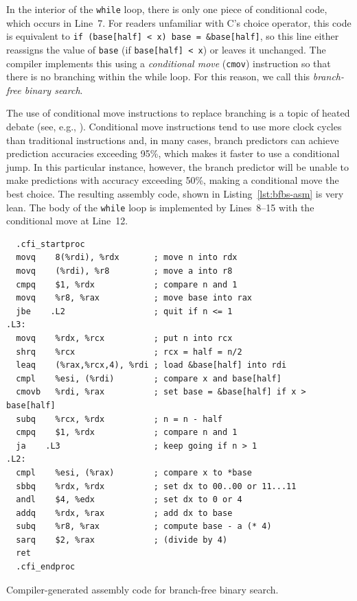 \documentclass{patmorin}
\newcommand{\lstlabel}[1]{\label{lst:#1}}
\newcommand{\lstref}[1]{Listing~\ref{lst:#1}}
\begin{document}
In the interior of the \texttt{while} loop, there is only one
piece of conditional code, which occurs in Line~7.  For readers unfamiliar
with C's choice operator, this code is equivalent to \texttt{if
(base[half] < x) base = &base[half]}, so this line either reassigns
the value of \texttt{base} (if \texttt{base[half]
< x}) or leaves it unchanged.  The compiler implements this using a
\emph{conditional move} (\texttt{cmov}) instruction so that
there is no branching within the while loop.  For this reason, we call
this \emph{branch-free binary search}.

The use of conditional move instructions to replace branching is a
topic of heated debate (see, e.g., \cite{torvalds:cmov}).  Conditional
move instructions tend to use more clock cycles than traditional
instructions and, in many cases, branch predictors can achieve prediction
accuracies exceeding 95\%, which makes it faster to use a conditional
jump.  In this particular instance, however, the branch predictor will
be unable to make predictions with accuracy exceeding 50\%, making a
conditional move the best choice.  The resulting assembly code, shown in
\lstref{bfbs-asm} is very lean.  The body of the \texttt{while}
loop is implemented by Lines~8--15 with the conditional move at Line~12.


\begin{listing}
\begin{verbatim}
  .cfi_startproc
  movq    8(%rdi), %rdx       ; move n into rdx
  movq    (%rdi), %r8         ; move a into r8
  cmpq    $1, %rdx            ; compare n and 1
  movq    %r8, %rax           ; move base into rax
  jbe    .L2                  ; quit if n <= 1
.L3:
  movq    %rdx, %rcx          ; put n into rcx
  shrq    %rcx                ; rcx = half = n/2
  leaq    (%rax,%rcx,4), %rdi ; load &base[half] into rdi
  cmpl    %esi, (%rdi)        ; compare x and base[half]
  cmovb   %rdi, %rax          ; set base = &base[half] if x > base[half]
  subq    %rcx, %rdx          ; n = n - half
  cmpq    $1, %rdx            ; compare n and 1
  ja    .L3                   ; keep going if n > 1
.L2:
  cmpl    %esi, (%rax)        ; compare x to *base
  sbbq    %rdx, %rdx          ; set dx to 00..00 or 11...11
  andl    $4, %edx            ; set dx to 0 or 4 
  addq    %rdx, %rax          ; add dx to base
  subq    %r8, %rax           ; compute base - a (* 4)
  sarq    $2, %rax            ; (divide by 4)
  ret
  .cfi_endproc
\end{verbatim}
\caption{Compiler-generated assembly code for branch-free binary search.}
\lstlabel{bfbs-asm}
\end{listing}
\end{document}
